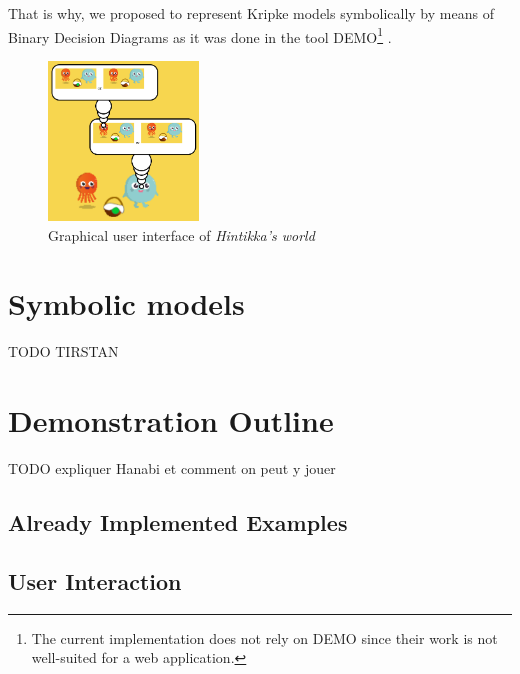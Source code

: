 \documentclass{article}
\begin{document}
That is why, we proposed to represent Kripke models symbolically by means of Binary Decision Diagrams as it was done in the tool DEMO\footnote{The current implementation does not rely on DEMO since their work is not well-suited for a web application.}  \cite{DBLP:conf/lori/BenthemEGS15}. 





\begin{figure}
	\begin{center}
		\includegraphics[width=4cm]{screenshot.png}
	\end{center}
	\caption{Graphical user interface of \emph{Hintikka's world}\label{figure:gui}}
\end{figure}

\section{Symbolic models}

TODO TIRSTAN


\section{Demonstration Outline}
\label{section:demonstration}

TODO expliquer Hanabi et comment on peut y jouer


\subsection{Already Implemented Examples}




\subsection{User Interaction}
\end{document}
